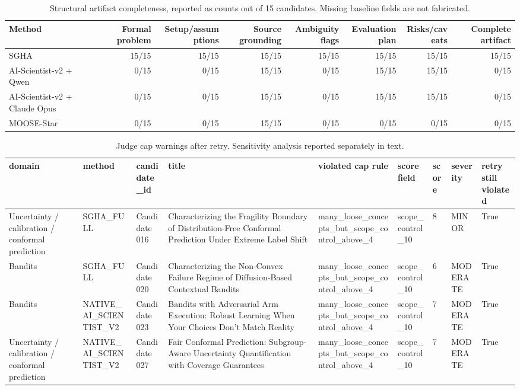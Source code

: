 \begin{table}[htbp]
\centering
\caption{Structural artifact completeness, reported as counts out of 15 candidates. Missing baseline fields are not fabricated.}
\label{tab:structural\_artifacts}
\begin{tabular}{lrrrrrrr}
\toprule
Method & Formal problem & Setup/assumptions & Source grounding & Ambiguity flags & Evaluation plan & Risks/caveats & Complete artifact \\
\midrule
SGHA & 15/15 & 15/15 & 15/15 & 15/15 & 15/15 & 15/15 & 15/15 \\
AI-Scientist-v2 + Qwen & 0/15 & 0/15 & 15/15 & 0/15 & 15/15 & 15/15 & 0/15 \\
AI-Scientist-v2 + Claude Opus & 0/15 & 0/15 & 15/15 & 0/15 & 15/15 & 15/15 & 0/15 \\
MOOSE-Star & 0/15 & 0/15 & 15/15 & 0/15 & 0/15 & 0/15 & 0/15 \\
\bottomrule
\end{tabular}
\end{table}



\begin{table}[htbp]
\centering
\caption{Judge cap warnings after retry. Sensitivity analysis reported separately in text.}
\label{tab:cap\_warnings}
\begin{tabular}{lllllllll}
\toprule
domain & method & candidate\_id & title & violated cap rule & score field & score & severity & retry still violated \\
\midrule
Uncertainty / calibration / conformal prediction & SGHA\_FULL & Candidate 016 & Characterizing the Fragility Boundary of Distribution-Free Conformal Prediction Under Extreme Label Shift & many\_loose\_concepts\_but\_scope\_control\_above\_4 & scope\_control\_10 & 8 & MINOR & True \\
Bandits & SGHA\_FULL & Candidate 020 & Characterizing the Non-Convex Failure Regime of Diffusion-Based Contextual Bandits & many\_loose\_concepts\_but\_scope\_control\_above\_4 & scope\_control\_10 & 6 & MODERATE & True \\
Bandits & NATIVE\_AI\_SCIENTIST\_V2 & Candidate 023 & Bandits with Adversarial Arm Execution: Robust Learning When Your Choices Don't Match Reality & many\_loose\_concepts\_but\_scope\_control\_above\_4 & scope\_control\_10 & 7 & MODERATE & True \\
Uncertainty / calibration / conformal prediction & NATIVE\_AI\_SCIENTIST\_V2 & Candidate 027 & Fair Conformal Prediction: Subgroup-Aware Uncertainty Quantification with Coverage Guarantees & many\_loose\_concepts\_but\_scope\_control\_above\_4 & scope\_control\_10 & 7 & MODERATE & True \\
\bottomrule
\end{tabular}
\end{table}

